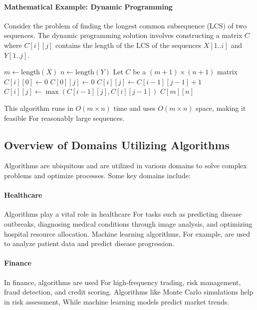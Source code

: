\documentclass[12pt]{book} %
\begin{document}
\paragraph{Mathematical Example: Dynamic Programming}
Consider the problem of finding the longest common subsequence (LCS) of two sequences. The dynamic programming solution involves constructing a matrix $C$ where $C[i][j]$ contains the length of the LCS of the sequences $X[1..i]$ and $Y[1..j]$.
\FloatBarrier
\begin{algorithm}[H]
\caption{Longest Common Subsequence (LCS)}
\begin{algorithmic}[1]
\State $m \gets \text{length}(X)$
\State $n \gets \text{length}(Y)$
\State Let $C$ be a $(m+1) \times (n+1)$ matrix
\State $C[i][0] \gets 0$
\EndFor
{}
\State $C[0][j] \gets 0$
\EndFor
{}
\State $C[i][j] \gets C[i-1][j-1] + 1$
\Else
\State $C[i][j] \gets \max(C[i-1][j], C[i][j-1])$
\EndIf
\EndFor
\EndFor
\State \Return $C[m][n]$
\EndProcedure
\end{algorithmic}
\end{algorithm}
\FloatBarrier
This algorithm runs in $O(m \times n)$ time and uses $O(m \times n)$ space, making it feasible For reasonably large sequences.

\subsection{Overview of Domains Utilizing Algorithms}
Algorithms are ubiquitous and are utilized in various domains to solve complex problems and optimize processes. Some key domains include:

\paragraph{Healthcare}
Algorithms play a vital role in healthcare For tasks such as predicting disease outbreaks, diagnosing medical conditions through image analysis, and optimizing hospital resource allocation. Machine learning algorithms, For example, are used to analyze patient data and predict disease progression.

\paragraph{Finance}
In finance, algorithms are used For high-frequency trading, risk management, fraud detection, and credit scoring. Algorithms like Monte Carlo simulations help in risk assessment, While machine learning models predict market trends.
\end{document}
